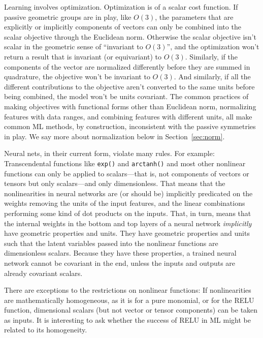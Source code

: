 \documentclass[accepted]{article}
\newcommand{\sectionname}{Section}
\newcommand{\secref}[1]{\sectionname~\ref{#1}}
\begin{document}
Learning involves optimization.
Optimization is of a scalar cost function.
If passive geometric groups are in play, like $O(3)$, the parameters that are explicitly or implicitly components of vectors can only be combined into the scalar objective through the Euclidean norm. Otherwise the scalar objective isn't scalar in the geometric sense of ``invariant to $O(3)$'', and the optimization won't return a result that is invariant (or equivariant) to $O(3)$.
Similarly, if the components of the vector are normalized differently before they are summed in quadrature, the objective won't be invariant to $O(3)$.
And similarly, if all the different contributions to the objective aren't converted to the same units before being combined, the model won't be units covariant.
The common practices of making objectives with functional forms other than Euclidean norm, normalizing features with data ranges, and combining features with different units, all make common ML methods, by construction, inconsistent with the passive symmetries in play.
We say more about normalization below in \secref{sec:norm}.

Neural nets, in their current form, violate many rules. For example:
Transcendental functions like \texttt{exp()} and \texttt{arctanh()} and most other nonlinear functions can only be applied to scalars---that is, not components of vectors or tensors but only scalars---and only dimensionless.
That means that the nonlinearities in neural networks are (or should be) implicitly predicated on the weights removing the units of the input features, and the linear combinations performing some kind of dot products on the inputs.
That, in turn, means that the internal weights in the bottom and top layers of a neural network \emph{implicitly} have geometric properties and units.
They have geometric properties and units such that the latent variables passed into the nonlinear functions are dimensionless scalars.
Because they have these properties, a trained neural network cannot be covariant in the end, unless the inputs and outputs are already covariant scalars.

There are exceptions to the restrictions on nonlinear functions:
If nonlinearities are mathematically homogeneous, as it is for a pure monomial, or for the RELU function, dimensional scalars (but not vector or tensor components) can be taken as inputs.
It is interesting to ask whether the success of RELU in ML might be related to its homogeneity.
\end{document}
